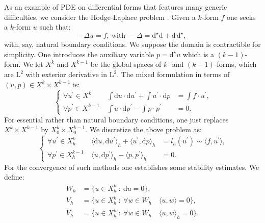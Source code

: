 \documentclass[10pt,a4paper]{article}
\newcommand{\rmd}{\mathrm{d}}
\newcommand{\rmL}{\mathrm{L}}
\newcommand{\test}{\prime}
\newcommand{\mixedright}[8]{
\
\left\{
\begin{array}{llll}
\forall #1  \in #2 \ & #3  & = #4\\
\forall #5  \in #6 \ & #7  & = #8
\end{array}
\right.
}
\theoremstyle{remark}
\theoremstyle{definition}
\numberwithin{equation}{section}
\begin{document}
As an example of PDE on differential forms that features many generic difficulties, we consider the Hodge-Laplace problem \cite{ArnFalWin10}. Given a $k$-form $f$ one seeks a $k$-form $u$ such that:
\begin{equation}
  - \Delta u = f, \ \textrm{with } -\Delta = \rmd^\star \rmd + \rmd\, \rmd^\star,
\end{equation}
with, say, natural boundary conditions. We suppose the domain is contractible for simplicity. One introduces the auxiliary variable $p = \rmd^\star u$ which is a $(k-1)$-form. We let $X^k$ and $X^{k-1}$ be the global spaces of $k$- and $(k-1)$-forms, which are $\rmL^2$ with exterior derivative in $\rmL^2$. The mixed formulation in terms of $(u, p) \in X^k \times X^{k-1}$ is:
\begin{equation}
\mixedright{u^\test}{X^k}{\int \rmd u \cdot \rmd u^\test + \int u^\test \cdot \rmd p}{\int f \cdot u^\test, }{p^\test}{X^{k-1}}{ \int u \cdot \rmd p^\test - \int p \cdot  p^\test}{0.}
\end{equation}
For essential rather than natural boundary conditions, one just replaces $X^k \times X^{k-1}$ by $X^k_0 \times X^{k-1}_0$.
We discretize the above problem as:
\begin{equation}
\mixedright{u^\test}{X^k_h}{\langle \rmd u , \rmd u^\test \rangle_h + \langle u^\test, \rmd p \rangle_h}{l_h(u^\test) \sim \langle f, u^\test \rangle, }{p^\test}{X^{k-1}_h}{ \langle u, \rmd p^\test \rangle_h-  \langle p ,  p^\test \rangle_h }{0.}
\end{equation}
For the convergence of such methods one establishes some stability estimates. We define:
\begin{align}
  W_h & = \{u \in X^k_h \ : \ \rmd u = 0\},\\
  V_h & = \{u \in X^k_h \ : \ \forall w \in W_h \quad \langle u, w \rangle = 0\},\\
  \widetilde V_h & = \{u \in X^k_h \ : \ \forall w \in W_h \quad \langle u, w \rangle_h = 0\}.
\end{align}
\end{document}
